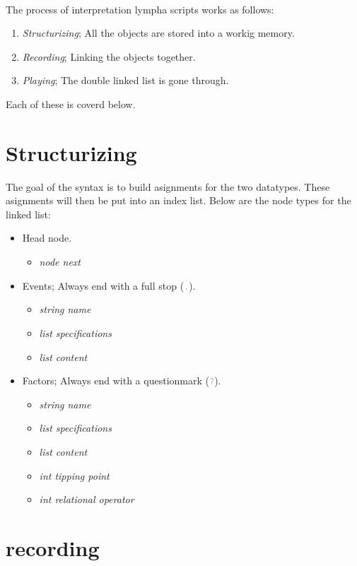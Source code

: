 \documentclass[15pt,a4paper,oneside]{article}
\newcommand{\code}[1]{{\textcolor{violet}{\texttt{\small #1}}}}
\begin{document}
\newpage
\ \\
The process of interpretation {\sc lympha} scripts works as follows:
\begin{enumerate}
\item {\it Structurizing}; All the objects are stored into a workig memory.
\item {\it Recording}; Linking the objects together.
\item {\it Playing}; The double linked list is gone through.
\end{enumerate}
Each of these is coverd below.
\section{Structurizing}
The goal of the syntax is to build asignments for the two datatypes. These asignments will then be put into an index list. Below are the node types for the linked list:

\begin{itemize}
\item Head node.
\begin{itemize}
\item {\it node next}
\end{itemize}
\item Events; Always end with a full stop (\code{.}).
\begin{itemize}
\item {\it string name}
\item {\it list specifications}
\item {\it list content}
\end{itemize}
\item Factors; Always end with a questionmark (\code{?}).
\begin{itemize}
\item {\it string name}
\item {\it list specifications}
\item {\it list content}
\item {\it int tipping point}
\item {\it int relational operator}
\end{itemize}
\end{itemize}

\section{recording}
\end{document}
